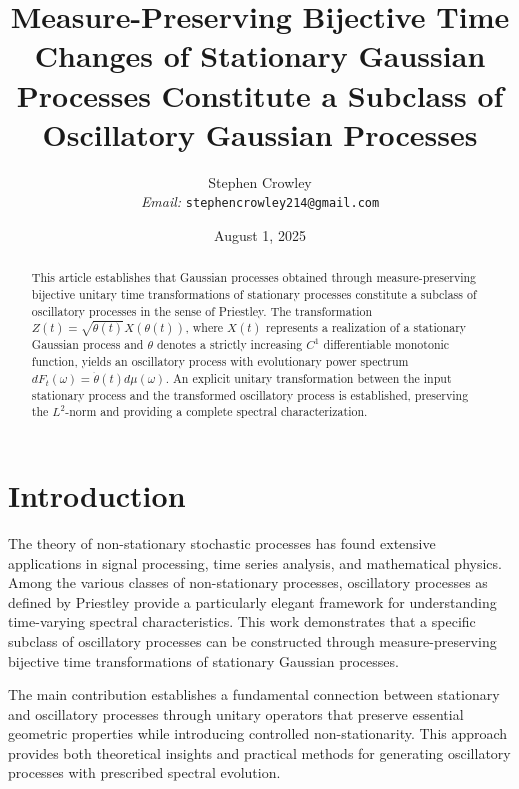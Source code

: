 \documentclass{article}
\newcommand{\tmemail}[1]{\\ \textit{Email:} \texttt{#1}}
\begin{document}
\title{Measure-Preserving Bijective Time Changes of Stationary Gaussian
Processes Constitute a Subclass of Oscillatory Gaussian Processes}

\author{
  Stephen Crowley
  \tmemail{stephencrowley214@gmail.com}
}

\date{August 1, 2025}

\maketitle

\begin{abstract}
  This article establishes that Gaussian processes obtained through
  measure-preserving bijective unitary time transformations of stationary
  processes constitute a subclass of oscillatory processes in the sense of
  Priestley. The transformation $Z (t) = \sqrt{\dot{\theta} (t)} X (\theta
  (t))$, where $X (t)$ represents a realization of a stationary Gaussian
  process and $\theta$ denotes a strictly increasing $C^1$ differentiable
  monotonic function, yields an oscillatory process with evolutionary power
  spectrum $dF_t (\omega) = \dot{\theta} (t) d \mu (\omega)$. An explicit
  unitary transformation between the input stationary process and the
  transformed oscillatory process is established, preserving the $L^2$-norm
  and providing a complete spectral characterization.
\end{abstract}

{\tableofcontents}

\section{Introduction}

The theory of non-stationary stochastic processes has found extensive
applications in signal processing, time series analysis, and mathematical
physics. Among the various classes of non-stationary processes, oscillatory
processes as defined by Priestley provide a particularly elegant framework for
understanding time-varying spectral characteristics. This work demonstrates
that a specific subclass of oscillatory processes can be constructed through
measure-preserving bijective time transformations of stationary Gaussian
processes.

The main contribution establishes a fundamental connection between stationary
and oscillatory processes through unitary operators that preserve essential
geometric properties while introducing controlled non-stationarity. This
approach provides both theoretical insights and practical methods for
generating oscillatory processes with prescribed spectral evolution.
\end{document}

